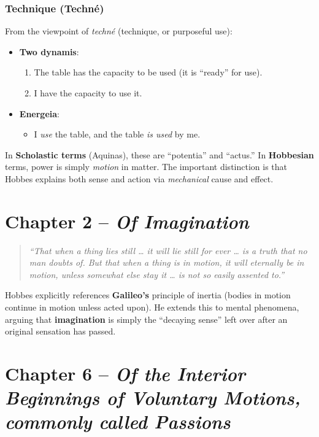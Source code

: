 \subsubsection*{Technique (Techn\'e)}
From the viewpoint of \textit{techn\'e} (technique, or purposeful use):
\begin{itemize}
  \item \textbf{Two dynamis}:
  \begin{enumerate}
    \item The table has the capacity to be used (it is “ready” for use).
    \item I have the capacity to use it.
  \end{enumerate}
  \item \textbf{Energeia}:
    \begin{itemize}
      \item I \textit{use} the table, and the table \textit{is used} by me.
    \end{itemize}
\end{itemize}

In \textbf{Scholastic terms} (Aquinas), these are “potentia” and “actus.” In \textbf{Hobbesian} terms, power is simply \textit{motion} in matter. The important distinction is that Hobbes explains both sense and action via \textit{mechanical} cause and effect.

\section*{Chapter 2 -- \textit{Of Imagination}}

\begin{quote}
\textit{“That when a thing lies still … it will lie still for ever … is a truth that no man doubts of. But that when a thing is in motion, it will eternally be in motion, unless somewhat else stay it … is not so easily assented to.”}
\end{quote}

Hobbes explicitly references \textbf{Galileo’s} principle of inertia (bodies in motion continue in motion unless acted upon). He extends this to mental phenomena, arguing that \textbf{imagination} is simply the “decaying sense” left over after an original sensation has passed.

\section*{Chapter 6 -- \textit{Of the Interior Beginnings of Voluntary Motions, commonly called Passions}}

